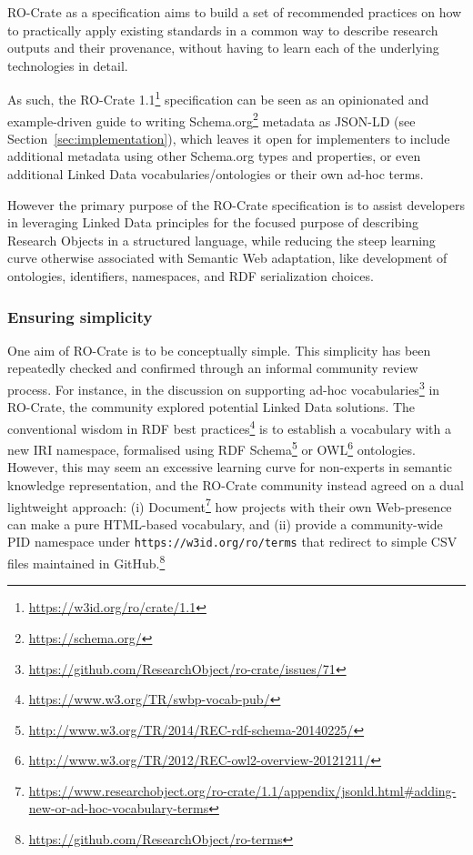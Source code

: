 \documentclass[ds,v1.1.2,openaccess]{iosart2x}%
\begin{document}
\label{sec:recommendedpractices}

RO-Crate as a specification aims to build a set of recommended
practices on how to practically apply existing standards in a common
way to describe research outputs and their provenance, without having
to learn each of the underlying technologies in detail.

As such, the RO-Crate 1.1\footnote{\url{https://w3id.org/ro/crate/1.1}}
specification \cite{doi:10.5281/zenodo.4541002} can be seen as an
opinionated and example-driven guide to writing
Schema.org\footnote{\url{https://schema.org/}} \cite{doi:10.1145/2857274.2857276}
metadata as JSON-LD \cite{sporny_2014} (see Section~\ref{sec:implementation}), which leaves it open for implementers to include
additional metadata using other Schema.org types and properties, or
even additional Linked Data vocabularies/ontologies or their own ad-hoc terms.

However the primary purpose of the RO-Crate specification is to assist
developers in leveraging Linked Data principles for the focused purpose
of describing Research Objects in a structured language, while reducing
the steep learning curve otherwise associated with Semantic Web
adaptation, like development of ontologies, identifiers, namespaces,
and RDF serialization choices.
\subsubsection{Ensuring simplicity}%

\label{sec:implicitly}

One aim of RO-Crate is to be conceptually simple. This simplicity has
been repeatedly checked and confirmed through an informal community
review process. For instance, in the discussion on supporting ad-hoc
vocabularies\footnote{\url{https://github.com/ResearchObject/ro-crate/issues/71}} in
RO-Crate, the community explored potential Linked Data solutions. The
conventional wisdom in RDF best
practices\footnote{\url{https://www.w3.org/TR/swbp-vocab-pub/}} is to establish a
vocabulary with a new IRI namespace, formalised using RDF
Schema\footnote{\url{http://www.w3.org/TR/2014/REC-rdf-schema-20140225/}} or
OWL\footnote{\url{http://www.w3.org/TR/2012/REC-owl2-overview-20121211/}}
ontologies. However, this may seem an excessive learning curve for
non-experts in semantic knowledge representation, and the RO-Crate
community instead agreed on a dual lightweight approach: (i)
Document\footnote{\url{https://www.researchobject.org/ro-crate/1.1/appendix/jsonld.html\#adding-new-or-ad-hoc-vocabulary-terms}}
how projects with their own Web-presence can make a pure HTML-based
vocabulary, and (ii) provide a community-wide PID namespace under
\texttt{https://w3id.org/ro/terms} that redirect to simple CSV files
maintained in GitHub.\footnote{\url{https://github.com/ResearchObject/ro-terms}}
\end{document}
